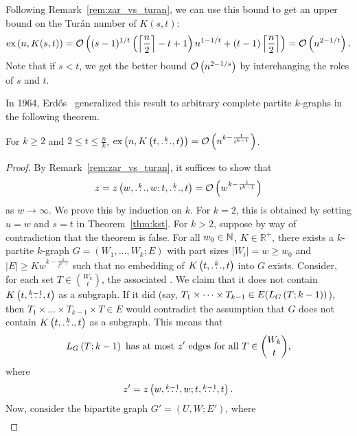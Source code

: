 \begin{remark}
    Following Remark~\ref{rem:zar_vs_turan}, we can use this bound to get an upper bound on the Turán number of $K(s, t)$:
    \[
        \text{ex} \left( n, K(s, t) \right) =
        \mathcal{O}\left((s - 1)^{1 / t}\left(\left\lceil\frac{n}{2}\right\rceil - t + 1\right)n^{1 - 1 / t} + (t - 1)\left\lceil\frac{n}{2}\right\rceil\right) =
        \mathcal{O}\left(n^{2 - 1 / t}\right).
    \]
    Note that if $s < t$, we get the better bound $\mathcal{O}\left(n^{2 - 1 / s}\right)$ by interchanging the roles of $s$ and $t$.
\end{remark}

In 1964, Erdős~\cite{Erods1964} generalized this result to arbitrary complete partite $k$-graphs in the following theorem.

\begin{theorem}\label{thm:erdos64}
    For $k \geq 2$ and $2 \leq t \leq \frac{n}{k}$,
    $\text{ex} \left( n, K\left(t, \overset{k}{\dots}, t\right) \right) = \mathcal{O}\left(n^{k - \frac{1}{t^{k-1}}}\right)$.
    \begin{proof}
        By Remark~\ref{rem:zar_vs_turan}, it suffices to show that
        \[
            z = z\left(w, \overset{k}{\dots}, w; t, \overset{k}{\dots}, t\right) = \mathcal{O}\left(w^{k - \frac{1}{t^{k-1}}}\right)
        \]
        as $w \to \infty$.
        We prove this by induction on $k$.
        For $k=2$, this is obtained by setting $u = w$ and $s = t$ in Theorem~\ref{thm:kst}.
        For $k > 2$, suppose by way of contradiction that the theorem is false.
        For all ${w_0 \in \mathbb{N}}$, ${K \in \mathbb{R}^+}$, there exists a $k$-partite $k$-graph
        $G = (W_1, \dots, W_k; E)$ with part sizes
        $|W_i| = w \geq w_0$ and
        ${|E| \geq K w^{k - \frac{1}{t^{k-1}}}}$
        such that no embedding of $K\left(t, \overset{k}{\dots}, t\right)$ into $G$ exists.
        Consider, for each set $T \in \binom{W_k}{t}$, the associated 
        .
        We claim that it does not contain $K\left(t, \overset{k-1}{\dots}, t\right)$ as a subgraph.
        If it did (say, $T_1 \times \dots \times T_{k-1} \in E(L_{G}\left(T; k-1\right))$),
        then $T_1 \times \dots \times T_{k-1} \times T \in E$
        would contradict the assumption that $G$ does not contain $K\left(t, \overset{k}{\dots}, t\right)$ as a subgraph.
        This means that
        \begin{equation} \label{eq:conditionlink}
            L_{G}\left(T; k-1\right) \text{ has at most $z'$ edges for all } T \in \binom{W_k}{t},
        \end{equation}
        where
        \[
            z' = z\left(w, \overset{k-1}{\dots}, w; t, \overset{k-1}{\dots}, t\right).
        \]
        Now, consider the bipartite graph $G' = (U, W; E')$, where
        \begin{align*}

\end{align*}
\end{proof}
\end{theorem}
